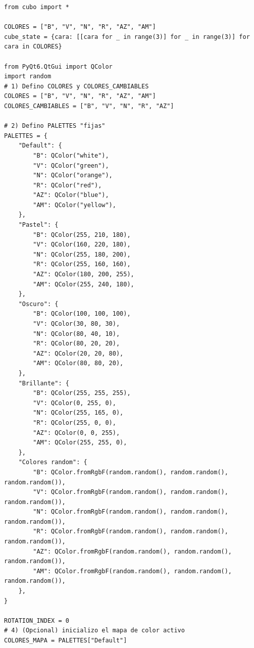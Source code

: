 \begin{lstlisting}
from cubo import *

COLORES = ["B", "V", "N", "R", "AZ", "AM"]
cube_state = {cara: [[cara for _ in range(3)] for _ in range(3)] for cara in COLORES}

from PyQt6.QtGui import QColor
import random
# 1) Defino COLORES y COLORES_CAMBIABLES
COLORES = ["B", "V", "N", "R", "AZ", "AM"]
COLORES_CAMBIABLES = ["B", "V", "N", "R", "AZ"]

# 2) Defino PALETTES "fijas"
PALETTES = {
    "Default": {
        "B": QColor("white"),
        "V": QColor("green"),
        "N": QColor("orange"),
        "R": QColor("red"),
        "AZ": QColor("blue"),
        "AM": QColor("yellow"),
    },
    "Pastel": {
        "B": QColor(255, 210, 180),  
        "V": QColor(160, 220, 180),  
        "N": QColor(255, 180, 200),  
        "R": QColor(255, 160, 160),  
        "AZ": QColor(180, 200, 255), 
        "AM": QColor(255, 240, 180), 
    },
    "Oscuro": {
        "B": QColor(100, 100, 100),
        "V": QColor(30, 80, 30),
        "N": QColor(80, 40, 10),
        "R": QColor(80, 20, 20),
        "AZ": QColor(20, 20, 80),
        "AM": QColor(80, 80, 20),
    },
    "Brillante": {
        "B": QColor(255, 255, 255),
        "V": QColor(0, 255, 0),
        "N": QColor(255, 165, 0),
        "R": QColor(255, 0, 0),
        "AZ": QColor(0, 0, 255),
        "AM": QColor(255, 255, 0),
    },
    "Colores random": {
        "B": QColor.fromRgbF(random.random(), random.random(), random.random()),
        "V": QColor.fromRgbF(random.random(), random.random(), random.random()),
        "N": QColor.fromRgbF(random.random(), random.random(), random.random()),
        "R": QColor.fromRgbF(random.random(), random.random(), random.random()),
        "AZ": QColor.fromRgbF(random.random(), random.random(), random.random()),
        "AM": QColor.fromRgbF(random.random(), random.random(), random.random()),
    },
}

ROTATION_INDEX = 0
# 4) (Opcional) inicializo el mapa de color activo
COLORES_MAPA = PALETTES["Default"]

\end{lstlisting}